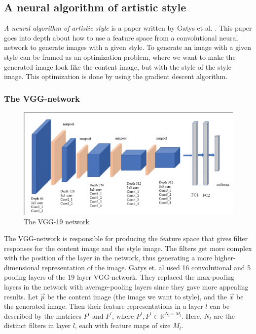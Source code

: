 \subsection{A neural algorithm of artistic style}
\label{sec:gatys}
\textit{A neural algorithm of artistic style} is a paper written by Gatys et al. \cite{Gatys:1}. This paper goes into depth about how to use a feature space from a convolutional neural network to generate images with a given style. To generate an image with a given style can be framed as an optimization problem, where we want to make the generated image look like the content image, but with the style of the style image. This optimization is done by using the gradient descent algorithm.
\subsubsection{The VGG-network}
\label{sec:vgg}
\begin{figure}[!ht]
\begin{center}
\includegraphics[scale=0.20]{report/Background/images/vgg19.png}
\caption{The VGG-19 network}
\label{fig:rotasjon}
\end{center}
\end{figure}
The VGG-network is responsible for producing the feature space that gives filter responses for the content image and the style image. The filters get more complex with the position of the layer in the network, thus generating a more higher-dimensional representation of the image. Gatys et. al used 16 convolutional and 5 pooling layers of the 19 layer VGG-network. They replaced the max-pooling layers in the network with average-pooling layers since they gave more appealing results. \newline\newline
Let $\vec{p}$ be the content image (the image we want to style), and the $\vec{x}$ be the generated image. Then their feature representations in a layer $l$ can be described by the matrices $P^l$ and $F^l$, where $P^l, F^l\in\mathbb{R}^{N_l\times M_l}$. Here, $N_l$ are the distinct filters in layer $l$, each with feature maps of size $M_l$. 
